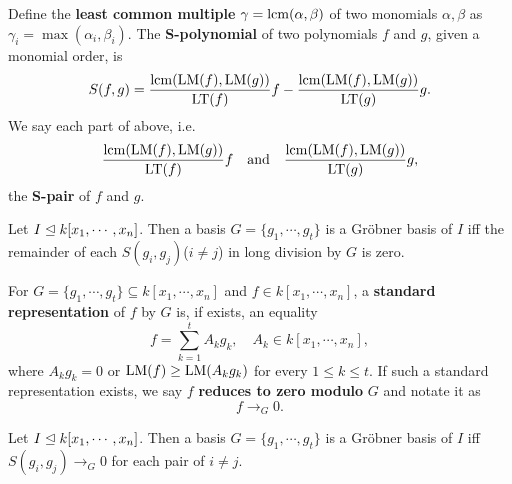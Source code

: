 \begin{definition}[S-polynomial]
    \label{def:SPolynomial}
    Define the \textbf{least common multiple} \(\gamma = \mathrm{lcm}(\alpha, \beta)\)
    of two monomials \(\alpha, \beta\) as \(\gamma_i = \max(\alpha_i, \beta_i)\).
    The \textbf{S-polynomial} of two polynomials \(f\) and \(g\), given a monomial order,
    is
    \[S(f, g) = \frac{\mathrm{lcm}(\mathrm{LM}(f), \mathrm{LM}(g))}{\mathrm{LT}(f)} f
              - \frac{\mathrm{lcm}(\mathrm{LM}(f), \mathrm{LM}(g))}{\mathrm{LT}(g)} g.\]
    We say each part of above, i.e.
    \[\frac{\mathrm{lcm}(\mathrm{LM}(f), \mathrm{LM}(g))}{\mathrm{LT}(f)} f \quad \textrm{and} \quad
      \frac{\mathrm{lcm}(\mathrm{LM}(f), \mathrm{LM}(g))}{\mathrm{LT}(g)} g,\]
    the \textbf{S-pair} of \(f\) and \(g\).
\end{definition}

\begin{theorem}
    \label{thm:BuchbergerCriterion}
    Let \(I \trianglelefteq k[x_1, \cdots, x_n]\). Then a basis \(G = \{g_1, \cdots, g_t\}\)
    is a Gr\"obner basis of \(I\) iff the remainder of each \(S(g_i, g_j)\)(\(i \ne j\))
    in long division by \(G\) is zero.
\end{theorem}

\begin{definition}
    \label{def:StandardRepresentation}
    For \(G = \{g_1, \cdots, g_t\} \subseteq k[x_1, \cdots, x_n]\) and \(f \in k[x_1, \cdots, x_n]\),
    a \textbf{standard representation} of \(f\) by \(G\) is, if exists, an equality
    \[f = \sum_{k=1}^t A_k g_k, \quad A_k \in k[x_1, \cdots, x_n],\]
    where \(A_k g_k = 0\) or \(\mathrm{LM}(f) \ge \mathrm{LM}(A_k g_k)\) for every \(1 \le k \le t\).
    If such a standard representation exists, we say \(f\) \textbf{reduces to zero modulo} \(G\)
    and notate it as
    \[f \to_G 0.\]
\end{definition}

\begin{theorem}
    \label{thm:RefinedBuchbergerCriterion}
    Let \(I \trianglelefteq k[x_1, \cdots, x_n]\). Then a basis \(G = \{g_1, \cdots, g_t\}\)
    is a Gr\"obner basis of \(I\) iff \(S(g_i, g_j) \to_G 0\) for each pair of \(i \ne j\).
\end{theorem}